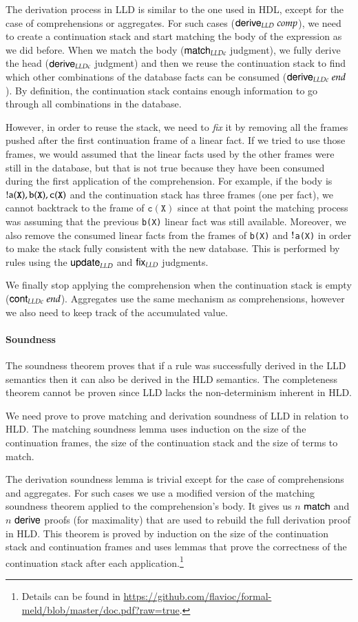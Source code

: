 The derivation process in LLD is similar to the one used in HDL, except for the case of comprehensions or aggregates. For such cases
($\mathsf{derive}_{LLD} \; comp$), we need to create a continuation stack and start matching the body of the expression as we did before.
When we match the body ($\mathsf{match}_{LLDc} \;$judgment), we fully derive the head ($\mathsf{derive}_{LLDc} \;$judgment) and then we reuse the continuation stack to find which
other combinations of the database facts can be consumed ($\mathsf{derive}_{LLDc} \; end$). By definition, the continuation stack contains
enough information to go through all combinations in the database.

However, in order to reuse the stack, we need to \emph{fix} it by removing all the frames pushed after the first continuation frame
of a linear fact. If we tried to use those frames, we would assumed that the linear facts used by the other frames were still in the database, but that
is not true because they have been consumed during the first application of the comprehension.
For example, if the body is ${!}\mathtt{a(X), b(X), c(X)}$ and the continuation stack has three frames (one per fact), we cannot backtrack to the frame of $\mathtt{c(X)}$
since at that point the matching process was assuming that the previous \texttt{b(X)} linear fact was still available.
Moreover, we also remove the consumed linear facts
from the frames of \texttt{b(X)} and ${!}$\texttt{a(X)} in order to make the stack fully consistent with the new database.
This is performed by rules using the $\mathsf{update}_{LLD} \;$and $\mathsf{fix}_{LLD} \;$judgments.

We finally stop applying the comprehension when the continuation stack is empty ($\mathsf{cont}_{LLDc} \; end$). 
Aggregates use the same mechanism as comprehensions, however we also need to keep track of the accumulated value.

\paragraph{Soundness}

The soundness theorem proves that if a rule was successfully derived in the LLD semantics then it can also be derived in the HLD semantics. The completeness theorem cannot
be proven since LLD lacks the non-determinism inherent in HLD.

We need prove to prove matching and derivation soundness of LLD in relation to HLD. The matching soundness lemma uses induction on the size of the continuation frames, the size of the continuation stack and the size of terms to match.

The derivation soundness lemma is trivial except for the case of comprehensions and aggregates. For such cases we use a modified version of the matching soundness theorem applied to the comprehension's body. It gives us $n$ $\mathsf{match} \;$and $n$ $\mathsf{derive} \;$proofs (for maximality) that are used to rebuild the full derivation proof in HLD. This theorem is proved by
induction on the size of the continuation stack and continuation frames and uses lemmas that prove the correctness of the continuation stack after each application.\footnote{Details can be
found in \url{https://github.com/flavioc/formal-meld/blob/master/doc.pdf?raw=true}.}

